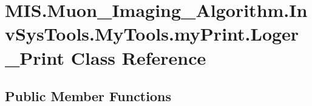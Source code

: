 \hypertarget{classMIS_1_1Muon__Imaging__Algorithm_1_1InvSysTools_1_1MyTools_1_1myPrint_1_1Loger__Print}{}\section{M\+I\+S.\+Muon\+\_\+\+Imaging\+\_\+\+Algorithm.\+Inv\+Sys\+Tools.\+My\+Tools.\+my\+Print.\+Loger\+\_\+\+Print Class Reference}
\label{classMIS_1_1Muon__Imaging__Algorithm_1_1InvSysTools_1_1MyTools_1_1myPrint_1_1Loger__Print}
\subsection*{Public Member Functions}
